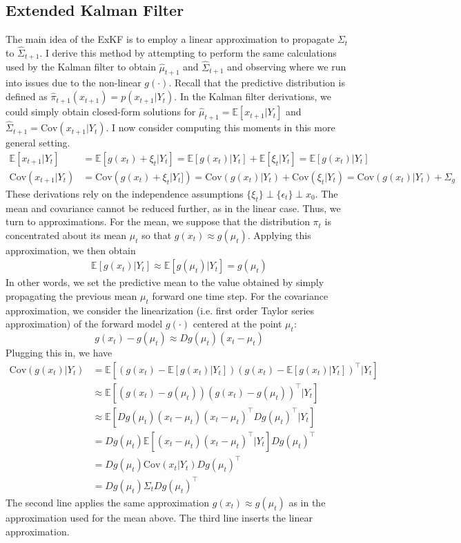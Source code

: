 \documentclass[12pt]{article}
\newcommand{\E}{\mathbb{E}}
\newcommand{\Cov}{\mathrm{Cov}}
\begin{document}
\subsection{Extended Kalman Filter}
The main idea of the ExKF is to employ a linear approximation to propagate $\Sigma_t$ to $\hat{\Sigma}_{t + 1}$. I derive this method by attempting to perform the same 
calculations used by the Kalman filter to obtain $\hat{\mu}_{t + 1}$ and $\hat{\Sigma}_{t + 1}$ and observing where we run into issues due to the non-linear $g(\cdot)$. 
Recall that the predictive distribution is defined as $\hat{\pi}_{t + 1}(x_{t+1}) = p(x_{t+1}|Y_t)$. In the Kalman filter derivations, we could simply obtain closed-form 
solutions for $\hat{\mu}_{t + 1} = \E[x_{t + 1}|Y_t]$ and $\hat{\Sigma}_{t+1} = \Cov(x_{t+1}|Y_t)$. I now consider computing this moments in this more general setting. 
\begin{align*}
\E[x_{t + 1}|Y_t] &= \E\left[g(x_t) + \xi_t|Y_t\right] = \E\left[g(x_t)|Y_t\right] + \E[\xi_t|Y_t] = \E\left[g(x_t)|Y_t\right] \\
\Cov(x_{t+1}|Y_t) &= \Cov\left(g(x_t) + \xi_t|Y_t]\right) = \Cov\left(g(x_t)|Y_t\right) + \Cov(\xi_t|Y_t) = \Cov\left(g(x_t)|Y_t\right) + \Sigma_g
\end{align*}
These derivations rely on the independence assumptions $\{\xi_t\} \perp \{\epsilon_t\} \perp x_0$. The mean and covariance cannot be reduced further, as in the linear 
case. Thus, we turn to approximations. For the mean, we suppose that the distribution $\pi_t$ is concentrated about its mean $\mu_t$ so that $g(x_t) \approx g(\mu_t)$. 
Applying this approximation, we then obtain  
\begin{align*}
\E\left[g(x_t)|Y_t\right] \approx \E\left[g(\mu_t) |Y_t \right] = g(\mu_t)
\end{align*}
In other words, we set the predictive mean to the value obtained by simply propagating the previous mean $\mu_t$ forward one time step. For the covariance approximation, 
we consider the linearization (i.e. first order Taylor series approximation) of the forward model $g(\cdot)$ centered at the point $\mu_t$: 
\[g(x_t) - g(\mu_t) \approx Dg(\mu_t)\left(x_t - \mu_t \right) \]
 Plugging this in, we have 
 \begin{align*}
 \Cov\left(g(x_t)|Y_t\right) &= \E\left[\left(g(x_t) - \E[g(x_t)|Y_t]\right)\left(g(x_t) - \E[g(x_t)|Y_t]\right)^{\top} | Y_t \right] \\
 				       &\approx \E\left[\left(g(x_t) - g(\mu_t)\right)\left(g(x_t) - g(\mu_t)\right)^{\top} | Y_t \right] \\
				       &\approx \E\left[Dg(\mu_t)\left(x_t - \mu_t \right) \left(x_t - \mu_t \right)^{\top} Dg(\mu_t)^\top  | Y_t \right] \\
				       &= Dg(\mu_t) \E\left[\left(x_t - \mu_t \right) \left(x_t - \mu_t \right)^{\top} | Y_t \right] Dg(\mu_t)^\top \\
				       &= Dg(\mu_t) \Cov(x_t|Y_t) Dg(\mu_t)^\top \\
				       &= Dg(\mu_t) \Sigma_t Dg(\mu_t)^\top
 \end{align*}
 The second line applies the same approximation $g(x_t) \approx g(\mu_t)$ as in the approximation used for the mean above. The third line inserts the linear approximation. 
\end{document}
